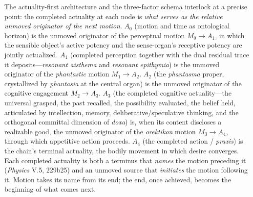 \documentclass{article}
\begin{document}
The actuality-first architecture and the three-factor schema interlock at a precise point: the completed actuality at each node is \textit{what serves as the relative unmoved originator of the next motion}. $A_0$ (motion and time as ontological horizon) is the unmoved originator of the perceptual motion $M_0 \rightarrow A_1$, in which the sensible object's active potency and the sense-organ's receptive potency are jointly actualized. $A_1$ (completed perception together with the dual residual trace it deposits---\textit{resonant aisthēma} and \textit{resonant epithymia}) is the unmoved originator of the \textit{phantastic} motion $M_1 \rightarrow A_2$. $A_2$ (the \textit{phantasma} proper, crystallized by \textit{phantasia} at the central organ) is the unmoved originator of the cognitive engagement $M_2 \rightarrow A_3$. $A_3$ (the completed cognitive actuality---the universal grasped, the past recalled, the possibility evaluated, the belief held, articulated by intellection, memory, deliberative/speculative thinking, and the orthogonal committal dimension of \textit{doxa}) is, when its content discloses a realizable good, the unmoved originator of the \textit{orektikon} motion $M_3 \rightarrow A_4$, through which appetitive action proceeds. $A_4$ (the completed action / \textit{praxis}) is the chain's terminal actuality, the bodily movement in which desire converges. Each completed actuality is both a terminus that \textit{names} the motion preceding it (\textit{Physics} V.5, 229b25) and an unmoved source that \textit{initiates} the motion following it. Motion takes its name from its end; the end, once achieved, becomes the beginning of what comes next. 
\end{document}
